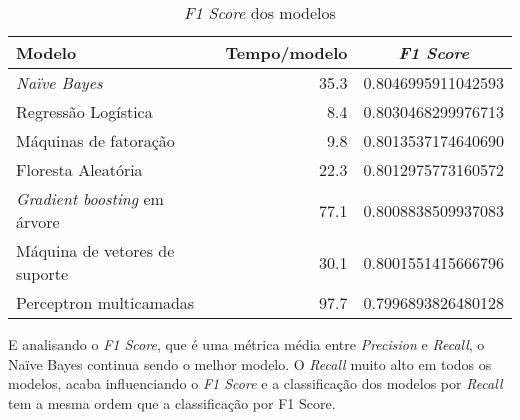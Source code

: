 \begin{table}[h]
    \centering
    \begin{tabular}{|l|r|c|}
        \hline
        Modelo                               & Tempo/modelo & \textit{F1 Score}  \\
        \hline
        \textit{Naïve Bayes}                 & 35.3         & 0.8046995911042593 \\
        Regressão Logística                  & 8.4          & 0.8030468299976713 \\
        Máquinas de fatoração                & 9.8          & 0.8013537174640690 \\
        Floresta Aleatória                   & 22.3         & 0.8012975773160572 \\
        \textit{Gradient boosting} em árvore & 77.1         & 0.8008838509937083 \\
        Máquina de vetores de suporte        & 30.1         & 0.8001551415666796 \\
        Perceptron multicamadas              & 97.7         & 0.7996893826480128 \\
        \hline
    \end{tabular}
    \caption{\textit{F1 Score} dos modelos}
    \label{tab:modelos-f1}
\end{table}

E analisando o \textit{F1 Score}, que é uma métrica média entre \textit{Precision} e \textit{Recall}, o Naïve Bayes continua sendo o melhor modelo.
O \textit{Recall} muito alto em todos os modelos, acaba influenciando o \textit{F1 Score} e a classificação dos modelos por \textit{Recall} tem a mesma ordem que a classificação por F1 Score.
